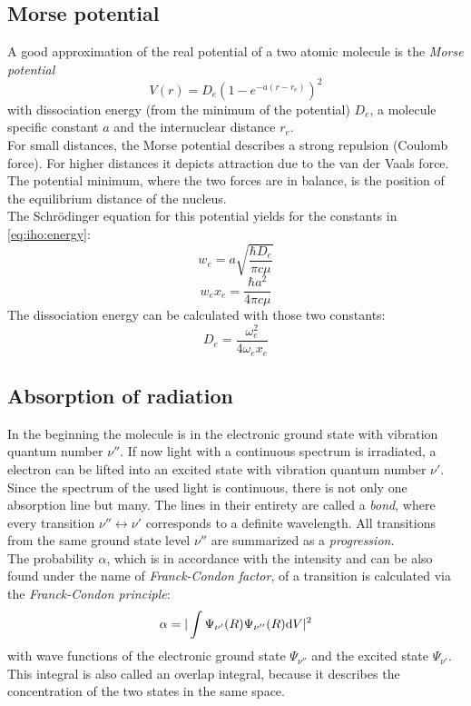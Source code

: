 \subsection{Morse potential}
A good approximation of the real potential of a two atomic molecule is the \emph{Morse potential}
\begin{equation}
\label{eq:morse}
  V(r) = D_e \left( 1 - e^{-a(r-r_e)} \right)^2
\end{equation}
with dissociation energy (from the minimum of the potential) $D_e$,
a molecule specific constant $a$  and the internuclear distance $r_e$. \\
For small distances, the Morse potential describes a strong repulsion (Coulomb force).
For higher distances it depicts attraction due to the van der Vaals force.
The potential minimum, where the two forces are in balance,
is the position of the equilibrium distance of the nucleus. \\
The Schrödinger equation for this potential yields for the constants in \autoref{eq:iho:energy}:
\begin{equation}
\label{eq:morse_we}
  w_e = a \sqrt{\frac{\hbar D_e}{\pi c \mu}}
\end{equation}
\begin{equation}
\label{eq:morse_wexe}
  w_e x_e = \frac{\hbar a^2}{4 \pi c \mu}
\end{equation}
The dissociation energy can be calculated with those two constants:
\begin{equation}
\label{eq:morse_dissenergy}
  D_e = \frac{\omega_e^2}{4 \omega_e x_e}
\end{equation}

\subsection{Absorption of radiation}
In the beginning the molecule is in the electronic ground state with vibration quantum number $\nu''$. If now light with a continuous spectrum is 
irradiated, a electron can be lifted into an excited state with vibration quantum number $\nu'$. Since the spectrum of the used light is continuous, there is not only one 
absorption line but many. The lines in their entirety are called a \emph{bond}, where every transition $\nu'' \leftrightarrow \nu'$ corresponds to 
a definite wavelength. All transitions from the same ground state level $\nu''$ are summarized as a \emph{progression}.\\
The probability $\alpha$, which is in accordance with the intensity and can be also found under the name of \emph{Franck-Condon factor}, 
of a transition is calculated via the \emph{Franck-Condon principle}:
\begin{equation}
  \alpha = | \int \Psi_{\nu'}(R) \Psi_{\nu''}(R) \mathrm{d} V |^2
\end{equation}
with wave functions of the electronic ground state $\Psi_{\nu''}$ and the excited state $\Psi_{\nu'}$.
This integral is also called an overlap integral, because it describes the concentration of the two states in the same space.

